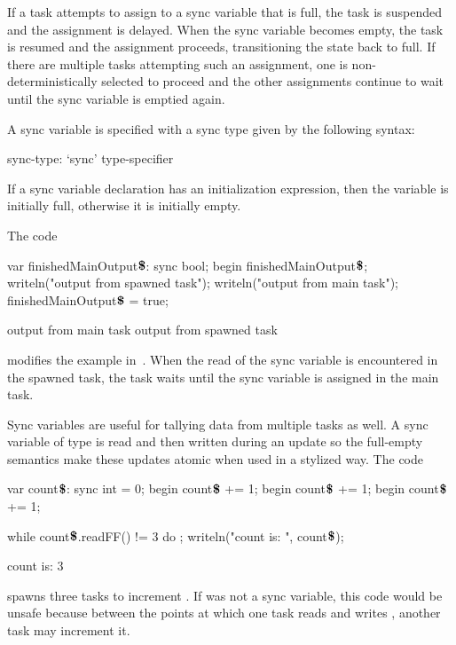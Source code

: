 If a task attempts to assign to a sync variable that is full, the task
is suspended and the assignment is delayed.  When the sync variable
becomes empty, the task is resumed and the assignment proceeds,
transitioning the state back to full.  If there are multiple tasks
attempting such an assignment, one is non-deterministically selected
to proceed and the other assignments continue to wait until the sync
variable is emptied again.

A sync variable is specified with a sync type given by the following
syntax:
\begin{syntax}
sync-type:
  `sync' type-specifier
\end{syntax}

If a sync variable declaration has an initialization expression, then
the variable is initially full, otherwise it is initially empty.

\begin{example}
The code
\begin{chapelpre}
\end{chapelpre}
\begin{chapel}
var finishedMainOutput$\mbox{{\bf \$}}$: sync bool;
begin {
  finishedMainOutput$\mbox{{\bf \$}}$;
  writeln("output from spawned task");
}
writeln("output from main task");
finishedMainOutput$\mbox{{\bf \$}}$ = true;
\end{chapel}
\begin{chapeloutput}
output from main task
output from spawned task
\end{chapeloutput}
modifies the example in~.  When the read of the sync
variable is encountered in the spawned task, the task waits until the
sync variable is assigned in the main task.
\end{example}

\begin{example}
Sync variables are useful for tallying data from multiple tasks as
well.  A sync variable of type  is read and then written
during an update so the full-empty semantics make these updates atomic
when used in a stylized way.  The code
\begin{chapelpre}
\end{chapelpre}
\begin{chapel}
var count$\mbox{{\bf \$}}$: sync int = 0;
begin count$\mbox{{\bf \$}}$ += 1;
begin count$\mbox{{\bf \$}}$ += 1;
begin count$\mbox{{\bf \$}}$ += 1;
\end{chapel}
\begin{chapelpost}
while count$\mbox{{\bf \$}}$.readFF() != 3 do ;
writeln("count is: ", count$\mbox{{\bf \$}}$);
\end{chapelpost}
\begin{chapeloutput}
count is: 3
\end{chapeloutput}
spawns three tasks to increment .
If  was not a sync variable, this code
would be unsafe because between the points at which one task
reads  and
writes , another task may increment it.
\end{example}

